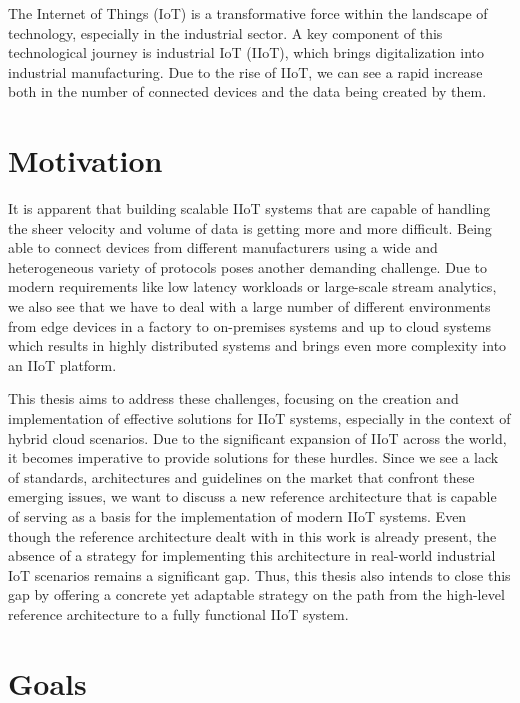 The Internet of Things (IoT) is a transformative force within the landscape of technology, especially in the industrial sector. A key component of this technological journey is industrial IoT (IIoT), which brings digitalization into industrial manufacturing. Due to the rise of IIoT, we can see a rapid increase both in the number of connected devices and the data being created by them.

\section{Motivation}
It is apparent that building scalable IIoT systems that are capable of handling the sheer velocity and volume of data is getting more and more difficult. Being able to connect devices from different manufacturers using a wide and heterogeneous variety of protocols poses another demanding challenge. Due to modern requirements like low latency workloads or large-scale stream analytics, we also see that we have to deal with a large number of different environments from edge devices in a factory to on-premises systems and up to cloud systems which results in highly distributed systems and brings even more complexity into an IIoT platform.

This thesis aims to address these challenges, focusing on the creation and implementation of effective solutions for IIoT systems, especially in the context of hybrid cloud scenarios. Due to the significant expansion of IIoT across the world, it becomes imperative to provide solutions for these hurdles. Since we see a lack of standards, architectures and guidelines on the market that confront these emerging issues, we want to discuss a new reference architecture that is capable of serving as a basis for the implementation of modern IIoT systems. Even though the reference architecture dealt with in this work is already present, the absence of a strategy for implementing this architecture in real-world industrial IoT scenarios remains a significant gap. Thus, this thesis also intends to close this gap by offering a concrete yet adaptable strategy on the path from the high-level reference architecture to a fully functional IIoT system.

\section{Goals}

